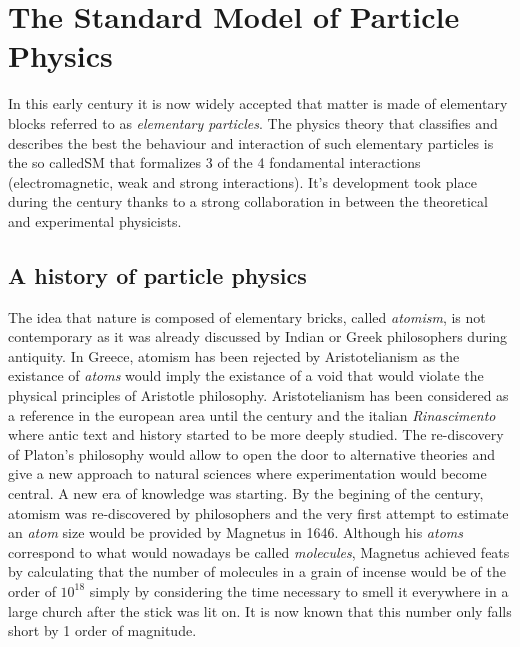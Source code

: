 \section{The Standard Model of Particle Physics}
\label{chapt2:sec:SM}

	In this early  century it is now widely accepted that matter is made of elementary blocks referred to as \textit{elementary particles}. The physics theory that classifies and describes the best the behaviour and interaction of such elementary particles is the so called\acl{SM} that formalizes 3 of the 4 fondamental interactions (electromagnetic, weak and strong interactions). It's development took place during the  century thanks to a strong collaboration in between the theoretical and experimental physicists.

	\subsection{A history of particle physics}
	\label{chapt2:ssec:history}
	
	The idea that nature is composed of elementary bricks, called \textit{atomism}, is not contemporary as it was already discussed by Indian or Greek philosophers during antiquity. In Greece, atomism has been rejected by Aristotelianism as the existance of \textit{atoms} would imply the existance of a void that would violate the physical principles of Aristotle philosophy. Aristotelianism has been considered as a reference in the european area until the  century and the italian \textit{Rinascimento} where antic text and history started to be more deeply studied. The re-discovery of Platon's philosophy would allow to open the door to alternative theories and give a new approach to natural sciences where experimentation would become central. A new era of knowledge was starting. By the begining of the  century, atomism was re-discovered by philosophers and the very first attempt to estimate an \textit{atom} size would be provided by Magnetus in 1646. Although his \textit{atoms} correspond to what would nowadays be called \textit{molecules}, Magnetus achieved feats by calculating that the number of molecules in a grain of incense would be of the order of $10^{18}$ simply by considering the time necessary to smell it everywhere in a large church after the stick was lit on. It is now known that this number only falls short by 1 order of magnitude.
	
